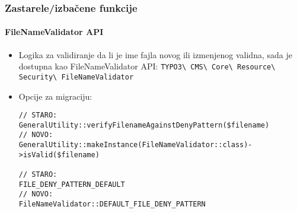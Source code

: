 
\begin{frame}[fragile]
	\frametitle{Zastarele/izbačene funkcije}
	\framesubtitle{FileNameValidator API}

	\lstset{basicstyle=\tiny\ttfamily}

	\begin{itemize}
		\item Logika za validiranje da li je ime fajla novog ili izmenjenog validna,
			sada je dostupna kao FileNameValidator API:\newline
			\small
				\texttt{TYPO3\textbackslash
					CMS\textbackslash
					Core\textbackslash
					Resource\textbackslash
					Security\textbackslash
					FileNameValidator}
			\normalsize

		\item Opcije za migraciju:

\begin{lstlisting}
// STARO:
GeneralUtility::verifyFilenameAgainstDenyPattern($filename)
// NOVO:
GeneralUtility::makeInstance(FileNameValidator::class)->isValid($filename)

// STARO:
FILE_DENY_PATTERN_DEFAULT
// NOVO:
FileNameValidator::DEFAULT_FILE_DENY_PATTERN
\end{lstlisting}

	\end{itemize}

\end{frame}


